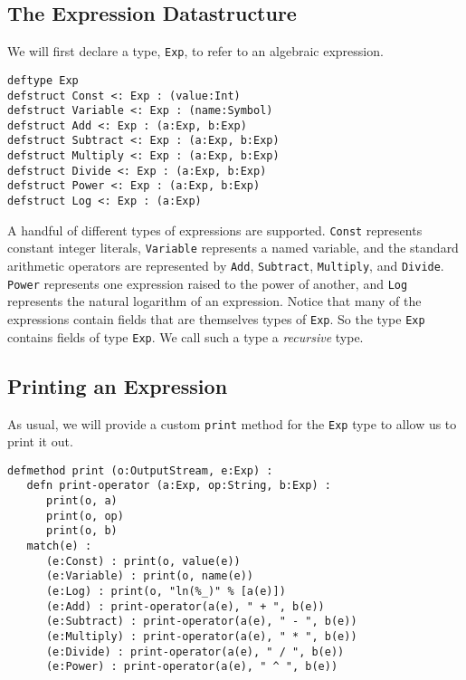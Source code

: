 \documentclass[10pt,oneside]{book}
\begin{document}
\subsection*{The Expression Datastructure}
We will first declare a type, \texttt{\frenchspacing Exp}, to refer to an algebraic expression. 
\begin{lstlisting}
deftype Exp
defstruct Const <: Exp : (value:Int)
defstruct Variable <: Exp : (name:Symbol)
defstruct Add <: Exp : (a:Exp, b:Exp)
defstruct Subtract <: Exp : (a:Exp, b:Exp)
defstruct Multiply <: Exp : (a:Exp, b:Exp)
defstruct Divide <: Exp : (a:Exp, b:Exp)
defstruct Power <: Exp : (a:Exp, b:Exp)
defstruct Log <: Exp : (a:Exp)
\end{lstlisting}
A handful of different types of expressions are supported. \texttt{\frenchspacing Const} represents constant integer literals, \texttt{\frenchspacing Variable} represents a named variable, and the standard arithmetic operators are represented by \texttt{\frenchspacing Add}, \texttt{\frenchspacing Subtract}, \texttt{\frenchspacing Multiply}, and \texttt{\frenchspacing Divide}. \texttt{\frenchspacing Power} represents one expression raised to the power of another, and \texttt{\frenchspacing Log} represents the natural logarithm of an expression. Notice that many of the expressions contain fields that are themselves types of \texttt{\frenchspacing Exp}. So the type \texttt{\frenchspacing Exp} contains fields of type \texttt{\frenchspacing Exp}. We call such a type a {\em recursive} type.

\subsection*{Printing an Expression}
As usual, we will provide a custom \texttt{\frenchspacing print} method for the \texttt{\frenchspacing Exp} type to allow us to print it out.
\begin{lstlisting}
defmethod print (o:OutputStream, e:Exp) :
   defn print-operator (a:Exp, op:String, b:Exp) :
      print(o, a)
      print(o, op)
      print(o, b)
   match(e) :
      (e:Const) : print(o, value(e))
      (e:Variable) : print(o, name(e))
      (e:Log) : print(o, "ln(%_)" % [a(e)])
      (e:Add) : print-operator(a(e), " + ", b(e))
      (e:Subtract) : print-operator(a(e), " - ", b(e))
      (e:Multiply) : print-operator(a(e), " * ", b(e))
      (e:Divide) : print-operator(a(e), " / ", b(e))
      (e:Power) : print-operator(a(e), " ^ ", b(e))
\end{lstlisting}
\end{document}
